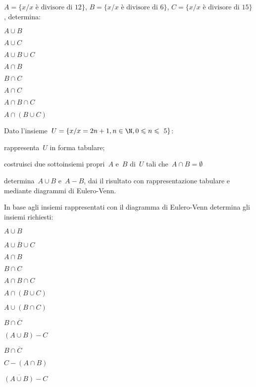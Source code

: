 \begin{esercizio}
\label{ese:7.88}
\(A=\{x/ x\text{ è divisore di }12\}\), \(B=\{x / x\text{ è divisore di 
}6\}\),
\(C=\{x / x\text{ è divisore di~15}\}\), determina:
\begin{multicols}{4}
 \begin{enumeratea}
 \item \(A\cup B\)
 \item \(A\cup C\)
 \item \(A\cup B\cup C\)
 \item \(A\cap B\)
 \item \(B\cap C\)
 \item \(A\cap C\)
 \item \(A\cap B\cap C\)
 \item \(A\cap(B\cup C)\)
 \end{enumeratea}
\end{multicols}
\end{esercizio}

\begin{esercizio}
\label{ese:7.89}
Dato l'insieme~\(U=\{x/x=2n+1,n\in\N,0\leqslant n\leqslant~5\}\):

\begin{enumeratea}
\item rappresenta~\(U\) in forma tabulare;
\item costruisci due sottoinsiemi propri~\(A\) e~\(B\) di~\(U\) tali che~\(A\cap 
B=\emptyset \)
\item determina~\(A\cup B\) e~\(A-B\), dai il risultato con rappresentazione 
tabulare e mediante diagrammi di
Eulero-Venn.
\end{enumeratea}
\end{esercizio}

\begin{esercizio}
\label{ese:7.90}
In base agli insiemi rappresentati con il diagramma di Eulero-Venn determina gli 
insiemi richiesti:
\begin{multicols}{2}
\begin{enumeratea}
\item \(A\cup B\)
\item \(\overline{{A\cup B\cup C}}\)
\item \(A\cap B\)
\item \(B\cap C\)
\item \(A\cap B\cap C\)
\item \(A\cap (B\cup C)\)
\item \(A\cup (B\cap C)\)
\item \(B\cap \overline{C}\)
\item \((A\cup B)-C\)
\item \(B\cap \overline{C}\)
\item \(C-(A\cap B)\)
\item \(\overline{{(A\cup B)}}-C\)
\end{enumeratea}
\begin{center}
 
\end{center}
\end{multicols}
\end{esercizio}

